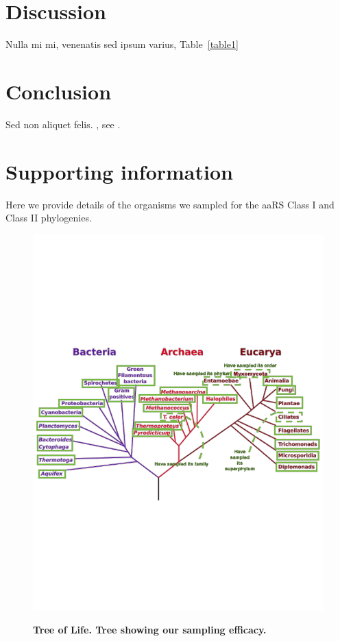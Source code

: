 \documentclass[10pt,letterpaper]{article}
\begin{document}
\section*{Discussion}
Nulla mi mi, venenatis sed ipsum varius, Table~\ref{table1} 

\section*{Conclusion}


Sed non aliquet felis. , see .

\section*{Supporting information}

Here we provide details of the organisms we sampled for the aaRS Class I and Class II phylogenies.

\begin{figure}
  \caption{\bf Tree of Life.  Tree showing our sampling efficacy.}
  \centering
    \includegraphics[width=\textwidth]{TreeofLife.pdf}
  \label{sampledtree}  
\end{figure}
\end{document}
